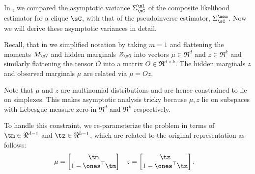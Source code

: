 \subsection{}
\label{app:pw-proof}

In , we compared the asymptotic variance
  $\Sigma^\ml_\sC$ of the composite likelihood estimator for a clique
  $\sC$, with that of the pseudoinverse estimator, $\Sigma^\mom_\sC$. 
  Now we will derive these asymptotic variances in detail.

Recall, that in  we simplified notation by taking
  $m=1$ and flattening the moments $M_\sV$ and hidden marginals $Z_\sC$
  into vectors $\mu \in \Re^d$ and $z \in \Re^k$ and similarly
  flattening the tensor $O$ into a matrix $O \in \Re^{d\times
  k}$.
The hidden marginals $z$ and observed marginals $\mu$ are related via
  $\mu = O z$.

Note that $\mu$ and $z$ are multinomial distributions and are hence
constrained to lie on simplexes. This makes asymptotic analysis tricky
because $\mu, z$ lie on subspaces with Lebesgue measure zero in $\Re^d$
and $\Re^k$ respectively. 

To handle this constraint, we re-parameterize the problem in terms of
  $\tm \in \Re^{d-1}$ and $\tz \in \Re^{k-1}$, 
which are related to the original representation as follows:
\begin{align*}
  \mu &= 
    \begin{bmatrix}
      \tm \\
      1 - \ones^\top\tm
    \end{bmatrix} 
  &
  z &= 
    \begin{bmatrix}
      \tz \\
      1 - \ones^\top\tz
    \end{bmatrix}.
\end{align*}

